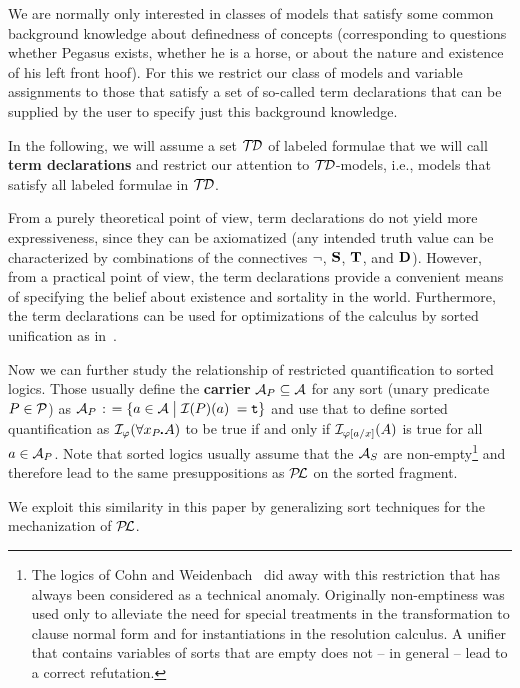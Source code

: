 \documentclass{\filespath jancl}
\def\setdivider{\;\bigl|\;}
\def\deq{{\;\colon\kern-.2em=\;}}
\def\phi{\varphi}
\def\cA{{\cal A}}\def\cB{{\cal B}}\def\cC{{\cal C}}
\def\sdot{\rule{.3ex}{.3ex}\hspace{-0.4ex}\;} %
\let\phi\varphi
\newcommand{\true}{{\sf t}}
\def\presuppl{{\cal P\kern-.4ex L}}
\def\Preds{{\cal P}}
\def\tf{{\bf D}}
\def\holds{{\bf T}}
\def\deft{{\bf S}}
\def\TermDecs{\cal T\kern-.3ex D}
\def\sf{\tt}
\begin{document}
We are normally only interested in classes of models that satisfy some common
background knowledge about definedness of concepts (corresponding to
questions whether Pegasus exists, whether he is a horse, or about the nature
and existence of his left front hoof). For this we restrict our class of
models and variable assignments to those that satisfy a set of so-called term
declarations that can be supplied by the user to specify just this background
knowledge.

\begin{definition}\label{Def:termdec}
  In the following, we will assume a set $\TermDecs$ of labeled
  formulae that we will call {\bf term declarations} and restrict our
  attention to $\TermDecs$-models, i.e., models that satisfy all labeled
  formulae in $\TermDecs$.
\end{definition}

{}From a purely theoretical point of view, term declarations do not yield more
expressiveness, since they can be axiomatized (any intended truth value can be
characterized by combinations of the connectives $\neg$, $\deft$,
$\holds$, and $\tf$).  However, from a practical point of view, the term
declarations provide a convenient means of specifying the belief about
existence and sortality in the world. Furthermore, the term declarations can
be used for optimizations of the calculus by sorted unification as
in~\cite{KeKo:atcfpf96}.

  
\begin{remark}
  Now we can further study the relationship of restricted quantification
  to sorted logics. Those usually define the {\bf carrier}
  $\cA_P\subseteq\cA$ for any sort (unary predicate $P\in\Preds$) as
  $\cA_P\deq\{a\in\cA\setdivider\cI(P)(a)$ $=\true\}$ and use that to
  define sorted quantification as $\cI_\phi(\forall x_P\sdot A)$ to be
  true if and only if $\cI_{\phi[a/x]}(A)$ is true for all $a\in\cA_P$. Note
  that sorted logics usually assume that the $\cA_S$ are
  non-empty\footnote{The logics of Cohn and
    Weidenbach~\cite{Cohn87,Weidenbach91} did away with this
    restriction that has always been considered as a technical anomaly. Originally
    non-emptiness was used only to alleviate the need for special treatments in the
    transformation to clause normal form and for instantiations in the
    resolution calculus. A unifier that contains variables of sorts
    that are empty does not -- in general --  lead to a correct refutation.} and
  therefore lead to the same presuppositions as $\presuppl$ on the
  sorted fragment.

  We exploit this similarity in this paper by generalizing sort techniques for
  the mechanization of $\presuppl$. 
\end{remark}
\end{document}
